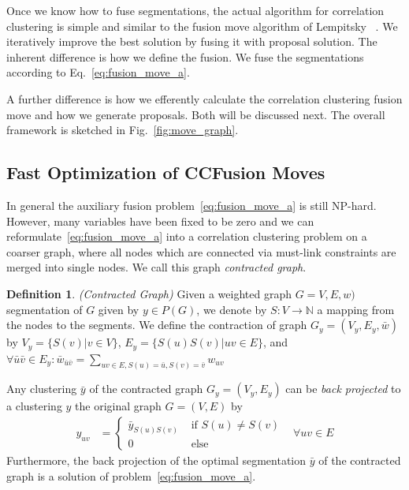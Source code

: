 \documentclass[10pt,twocolumn,letterpaper]{article}
\theoremstyle{definition}
\newtheorem{definition}{Definition}
\begin{document}
Once we know how to fuse segmentations, the actual algorithm 
for correlation clustering 
is simple and similar to the fusion move algorithm of Lempitsky \etal~\cite{Lempitsky-2010}.
We iteratively improve the best solution by
fusing it with proposal solution.
The inherent difference is how we define the fusion.
We fuse the segmentations according to Eq.~\ref{eq:fusion_move_a}.

A further difference is how we efferently calculate the correlation clustering fusion move and how we generate proposals.
Both will be discussed next. The overall framework is sketched in Fig.~\ref{fig:move_graph}.




%
%
%

%


\subsection{Fast Optimization of CCFusion Moves} \label{sec:fast_optimization}
In general the auxiliary fusion problem~\ref{eq:fusion_move_a} is still NP-hard.
However, many variables have been fixed to be zero and we can reformulate~\ref{eq:fusion_move_a}
into a correlation clustering problem on a coarser graph, where all nodes which are connected
via must-link constraints are merged into single nodes. We call this graph \emph{contracted graph}.
%
\begin{definition}\emph{(Contracted Graph)}
Given a weighted graph $G=V,E,w)$ segmentation of $G$ given by $y\in P(G)$,
we denote by $S: V \to \mathbb{N}$ a mapping from the nodes to the segments.
We define the contraction of graph $G_y=(V_y,E_y, \bar{w})$
by $V_y=\{S(v)|v\in V\}$, $E_y=\{S(u)S(v)|uv\in E\}$, and 
$\forall \bar{u}\bar{v}\in E_y: \bar{w}_{\bar{u}\bar{v}}=\sum_{uv\in E, S(u)=\bar{u},S(v)=\bar{v}}w_{uv}$ 
\end{definition}
%
Any clustering $\bar{y}$ of the contracted graph $G_y=(V_y,E_y)$ can be \emph{back projected} to a clustering $y$ the original graph $G=(V,E)$ by
%
\begin{align}
y_{uv}&=\left\{ 
\begin{array}{ll}
\bar{y}_{S(u)S(v)}& \textrm{ if }S(u) \neq S(v)\\
0                & \textrm{ else}
\end{array}
\right.& \forall uv \in E
\end{align}
Furthermore, the back projection of the optimal segmentation $\bar{y}$ of the contracted graph is a solution of problem~\ref{eq:fusion_move_a}.
\end{document}
